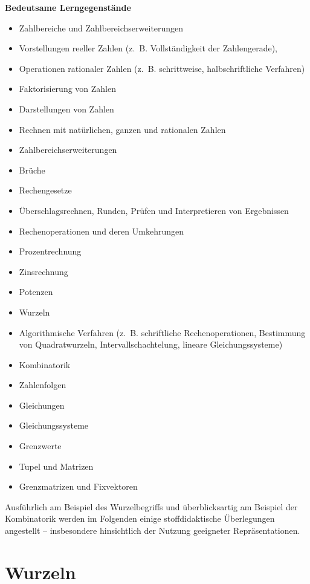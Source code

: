 \documentclass[
]{scrbook}
\providecommand{\tightlist}{%
  \setlength{\itemsep}{0pt}\setlength{\parskip}{0pt}}
\renewenvironment{quote}{
  \list{}{
	\leftmargin0.2cm   %
    \rightmargin\leftmargin
      	\def\FrameCommand
    {%
        {\color{quoteColor}\vrule width 2pt}%
        \hspace{0pt}%
    }%
    \MakeFramed{\advance \hsize -\width \FrameRestore}    \color{quoteColor}
    }
  \item\relax
}
{\endlist\color{black}\endMakeFramed}
\theoremstyle{definition}
\theoremstyle{definition}
\theoremstyle{definition}
\theoremstyle{definition}
\theoremstyle{remark}
\begin{document}
\begin{quote}
\textbf{Bedeutsame Lerngegenstände}

\begin{itemize}
\tightlist
\item
  Zahlbereiche und Zahlbereichserweiterungen
\item
  Vorstellungen reeller Zahlen (z.~B. Vollständigkeit der Zahlengerade),
\item
  Operationen rationaler Zahlen (z.~B. schrittweise, halbschriftliche Verfahren)
\item
  Faktorisierung von Zahlen
\item
  Darstellungen von Zahlen
\item
  Rechnen mit natürlichen, ganzen und rationalen Zahlen
\item
  Zahlbereichserweiterungen
\item
  Brüche
\item
  Rechengesetze
\item
  Überschlagsrechnen, Runden, Prüfen und Interpretieren von Ergebnissen
\item
  Rechenoperationen und deren Umkehrungen
\item
  Prozentrechnung
\item
  Zinsrechnung
\item
  Potenzen
\item
  Wurzeln
\item
  Algorithmische Verfahren (z.~B. schriftliche Rechenoperationen, Bestimmung von Quadratwurzeln, Intervallschachtelung, lineare Gleichungssysteme)
\item
  Kombinatorik
\item
  Zahlenfolgen
\item
  Gleichungen
\item
  Gleichungssysteme
\item
  Grenzwerte
\item
  Tupel und Matrizen
\item
  Grenzmatrizen und Fixvektoren
\end{itemize}
\end{quote}

Ausführlich am Beispiel des Wurzelbegriffs und überblicksartig am Beispiel der Kombinatorik werden im Folgenden einige stoffdidaktische Überlegungen angestellt -- insbesondere hinsichtlich der Nutzung geeigneter Repräsentationen.

\hypertarget{wurzeln}{%
\section{Wurzeln}\label{wurzeln}}
\end{document}
